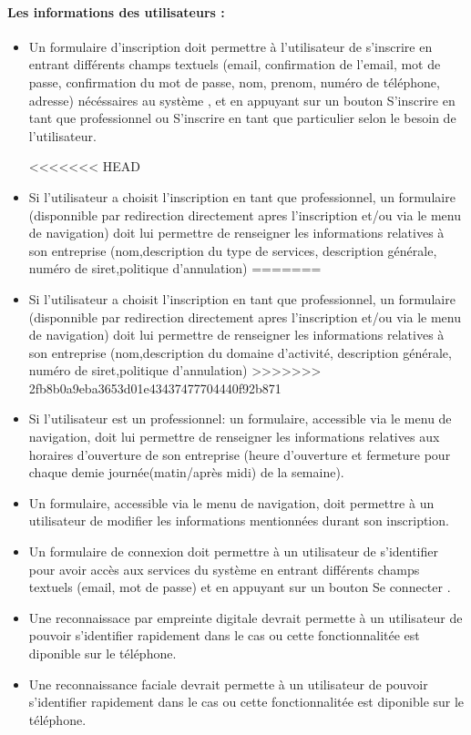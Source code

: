 \documentclass{article}
\begin{document}
\paragraph{Les informations des utilisateurs :}
\begin{itemize}
 \item Un formulaire d'inscription doit permettre à l'utilisateur de
   s'inscrire en entrant différents champs textuels (email,
   confirmation de l'email, mot de
   passe, confirmation du mot de passe, nom, prenom, numéro de téléphone, adresse) nécéssaires au
   système , et en appuyant sur
   un bouton \og S'inscrire en tant que professionnel\fg{} ou \og S'inscrire en tant que particulier\fg{} selon le besoin de l'utilisateur.

<<<<<<< HEAD
\item Si l'utilisateur a choisit l'inscription en tant que professionnel, un formulaire (disponnible par redirection
directement apres l'inscription et/ou via le menu de navigation) doit lui permettre de renseigner les informations relatives
à son entreprise (nom,description du type de services, description générale, numéro de siret,politique d'annulation)
=======
\item Si l'utilisateur a choisit l'inscription en tant que professionnel, un formulaire (disponnible par redirection 
directement apres l'inscription et/ou via le menu de navigation) doit lui permettre de renseigner les informations relatives 
à son entreprise (nom,description du domaine d'activité, description générale, numéro de siret,politique d'annulation)
>>>>>>> 2fb8b0a9eba3653d01e43437477704440f92b871

\item Si l'utilisateur est un professionnel: un formulaire, accessible via le menu de navigation,  doit lui permettre de renseigner les informations relatives aux
horaires d'ouverture de son entreprise (heure d'ouverture et fermeture pour chaque demie journée(matin/après midi) de la semaine).

\item Un formulaire, accessible via le menu de navigation, doit permettre à un utilisateur de modifier les
  informations mentionnées durant son inscription.
\item Un formulaire de connexion doit permettre à un utilisateur de
  s'identifier pour avoir accès aux services du système en entrant
  différents champs textuels (email, mot de passe) et en appuyant sur
  un bouton \og Se connecter \fg{}.

\item Une reconnaissace par empreinte digitale devrait permette à un
  utilisateur de pouvoir s'identifier rapidement dans le cas ou cette
  fonctionnalitée est diponible sur le téléphone.
\item Une reconnaissance faciale devrait permette à un
  utilisateur de pouvoir s'identifier rapidement dans le cas ou cette
  fonctionnalitée est diponible sur le téléphone.
\end{itemize}
\end{document}
